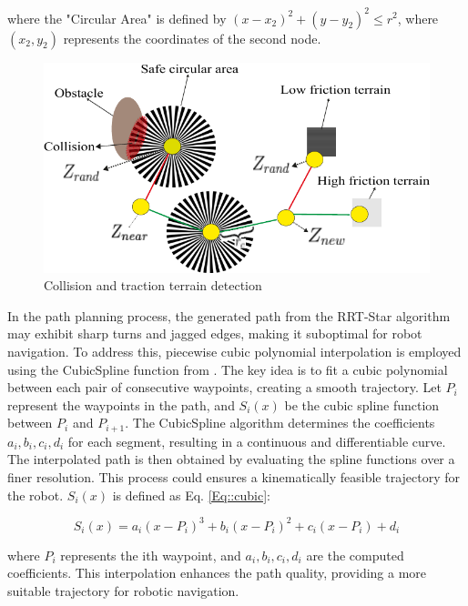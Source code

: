 \documentclass[conference]{IEEEtran}
\begin{document}
\noindent where the "Circular Area" is defined by \( (x - x_2)^2 + (y - y_2)^2 \leq r^2 \), where \( (x_2, y_2) \) represents the coordinates of the second node.

\begin{figure}[t!]
        \centering
        \includegraphics[width=\linewidth]{Images/collision_2.pdf}
        \caption{Collision and traction terrain detection}
        \label{fig:collision}
\end{figure}

In the path planning process, the generated path from the RRT-Star algorithm may exhibit sharp turns and jagged edges, making it suboptimal for robot navigation. To address this, piecewise cubic polynomial interpolation is employed using the CubicSpline function from \cite{scipy}. The key idea is to fit a cubic polynomial between each pair of consecutive waypoints, creating a smooth trajectory. Let $P_{i}$ represent the waypoints in the path, and $S_{i}(x)$ be the cubic spline function between $P_{i}$ and $P_{i+1}$. The CubicSpline algorithm determines the coefficients $a_{i}, b_{i}, c_{i}, d_{i}$ for each segment, resulting in a continuous and differentiable curve. The interpolated path is then obtained by evaluating the spline functions over a finer resolution. This process could ensures a kinematically feasible trajectory for the robot. $S_{i}(x)$ is defined as Eq. \ref{Eq::cubic}:

\begin{equation}
\label{Eq::cubic}
S_{i}(x) = a_{i}(x - P_i)^3 + b_{i}(x - P_i)^2 + c_{i}(x - P_i) + d_{i}
\end{equation}

\noindent where \(P_i\) represents the ith waypoint, and \(a_i, b_i, c_i, d_i\) are the computed coefficients. This interpolation enhances the path quality, providing a more suitable trajectory for robotic navigation.
\end{document}
